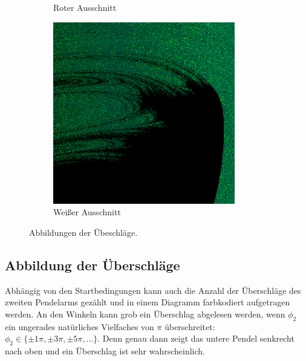 \begin{figure}
\begin{subfigure}[b]{0.32\textwidth}
                \caption{Roter Ausschnitt}
                \label{fig:fraktale_c}
        \end{subfigure}
        \begin{subfigure}[b]{0.32\textwidth}
                \centering
                \includegraphics[width=\textwidth]{images/fraktale/ausschnitt_d.png}
                \caption{Weißer Ausschnitt}
                \label{fig:fraktale_d}
        \end{subfigure}
        \caption{Abbildungen der Übeschläge.}
        \label{fig:fraktale}
\end{figure}

\subsection{Abbildung der Überschläge}

Abhängig von den Startbedingungen kann auch die Anzahl der Überschläge des zweiten Pendelarms gezählt und in einem Diagramm farbkodiert aufgetragen werden.
An den Winkeln kann grob ein Überschlag abgelesen werden, wenn $\phi_2$ ein ungerades natürliches Vielfaches von $\pi$ überschreitet: $\phi_2 \in \{ \pm 1 \pi, \pm 3 \pi, \pm 5 \pi, ... \}$.
Denn genau dann zeigt das untere Pendel senkrecht nach oben und ein Überschlag ist sehr wahrscheinlich.

